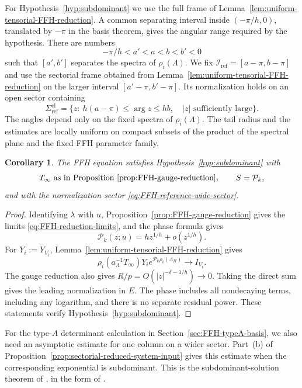 \documentclass[11pt,leqno]{amsart}
\numberwithin{equation}{section}
\theoremstyle{plain}
\newtheorem{corollary}[theorem]{Corollary}
\theoremstyle{definition}
\theoremstyle{plain}
\theoremstyle{definition}
\theoremstyle{remark}
\begin{document}
For Hypothesis~\ref{hyp:subdominant} we use the full frame of Lemma~\ref{lem:uniform-tensorial-FFH-reduction}.  A common separating interval inside $(-\pi/h,0)$, translated by $-\pi$ in the basis theorem, gives the angular range required by the hypothesis.  There are numbers
\[
 -\pi/h<a'<a<b<b'<0
\]
such that $[a',b']$ separates the spectra of $\rho_i(\Lambda)$.  We fix
$\mathcal I_{\mathrm{ref}}=[a-\pi,b-\pi]$ and use the sectorial frame obtained from Lemma~\ref{lem:uniform-tensorial-FFH-reduction} on the larger interval $[a'-\pi,b'-\pi]$.  Its normalization holds on an open sector containing
\begin{equation}\label{eq:FFH-reference-wide-sector}
 \Sigma_{\mathrm{ref}}^{\mathrm{cl}}
 =\{z:\ h(a-\pi)\le\arg z\le hb,\quad |z|\text{ sufficiently large}\}.
\end{equation}
The angles depend only on the fixed spectra of $\rho_i(\Lambda)$.  The tail radius and the estimates are locally uniform on compact subsets of the product of the spectral plane and the fixed FFH parameter family.

\begin{corollary}\label{cor:FFH-sectorial-hypothesis}
The FFH equation satisfies Hypothesis~\ref{hyp:subdominant} with
\[
 T_\infty\text{ as in Proposition~\ref{prop:FFH-gauge-reduction}},\qquad S=\mathcal P_k,
\]
and with the normalization sector \eqref{eq:FFH-reference-wide-sector}.
\end{corollary}
\begin{proof}
Identifying $\lambda$ with $u$, Proposition~\ref{prop:FFH-gauge-reduction} gives the limits \eqref{eq:FFH-reduction-limits}, and the phase formula gives
\[
 \mathcal P_k(z;u)=hz^{1/h}+o(z^{1/h}).
\]
For $Y_i:=Y_{V_i}$, Lemma~\ref{lem:uniform-tensorial-FFH-reduction} gives
\[
 \rho_i(a_\Lambda^{-1}T_\infty)Y_i
       e^{\mathcal P_k\rho_i(\Lambda_H)}\longrightarrow I_{V_i}.
\]
The gauge reduction also gives $R/p=O(|z|^{-\delta-1/h})\to0$.  Taking the direct sum gives the leading normalization in $E$.  The phase includes all nondecaying terms, including any logarithm, and there is no separate residual power.  These statements verify Hypothesis~\ref{hyp:subdominant}.
\end{proof}

For the type-$A$ determinant calculation in Section~\ref{sec:FFH-typeA-basis}, we also need an asymptotic estimate for one column on a wider sector.  Part~(b) of Proposition~\ref{prop:sectorial-reduced-system-input} gives this estimate when the corresponding exponential is subdominant.  This is the subdominant-solution theorem of \cite[Theorem~3.15(2) and Proposition~3.20(2)]{MR2024}, in the form of \cite[Theorem~3.26(2)]{CGM2025}.
\end{document}
